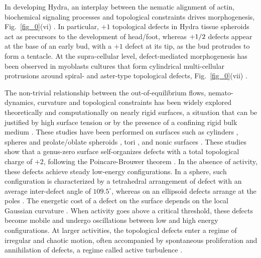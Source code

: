 In developing Hydra, an interplay between the nematic alignment of actin, biochemical signaling processes and topological constraints drives morphogenesis, Fig.~\ref{fig_0}(vi) \cite{maroudas2021}. In particular, $+1$ topological defects in Hydra tissue spheroids act as precursors to the development of head/foot, whereas ${\text +}1/2$ defects appear at the base of an early bud, with a $+1$ defect at its tip, as the bud protrudes to form a tentacle. At the supra-cellular level, defect-mediated morphogenesis has been observed in myoblasts cultures  that form cylindrical  multi-cellular  protrusions around spiral- and aster-type topological defects, Fig.~\ref{fig_0}(vii) \cite{guillamat2020}.



The non-trivial relationship between the out-of-equilibrium flows, nemato-dynamics, curvature and topological constraints has been widely explored theoretically and computationally on nearly rigid surfaces, a situation that can be justified by high surface tension or by the presence of  a confining rigid bulk medium  \cite{ellis2018}. These studies have been performed on surfaces such as cylinders \cite{napoli2020, pearce2020}, spheres and prolate/oblate spheroids \cite{nestler2018, torres2020, henkes2017, zhang2020, keber2014, vcopar2019,alaimo2017, ehrig2017,khoromskaia2017,kralj2011}, tori \cite{torres2020, ellis2018}, and nonic surfaces \cite{nestler2018}. These studies show that a genus-zero surface self-organizes defects with a total topological charge of $+2$, following the Poincare-Brouwer theorem \cite{kamien2002}. In the absence of activity, these defects achieve steady low-energy configurations. In a sphere, such configuration is characterized by a  tetrahedral arrangement of defect with an average inter-defect angle of $109.5^{\circ}$, whereas on an ellipsoid defects arrange at the poles \cite{nitschke2020}. The energetic cost of a defect on the surface depends on the local Gaussian curvature \cite{nestler2018, ellis2018}. When activity goes above a critical threshold, these defects become mobile and undergo oscillations between low and high energy configurations. At larger activities, the topological defects enter a regime of irregular and chaotic motion, often accompanied by spontaneous proliferation and annihilation of defects, a regime  called active turbulence \cite{ellis2018,vcopar2019,gao2017}. 

